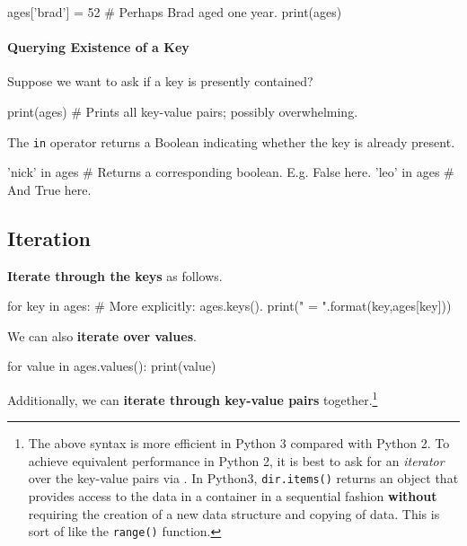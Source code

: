 \documentclass[12pt,letterpaper,twoside]{article}
\begin{document}
\begin{python}
ages['brad'] = 52   # Perhaps Brad aged one year.
print(ages)
\end{python}

\vspace{-12pt}
\paragraph{Querying Existence of a Key}

Suppose we want to ask if a key is presently contained?
\begin{python}
print(ages)  # Prints all key-value pairs; possibly overwhelming.
\end{python}

The \texttt{in} operator returns a Boolean indicating whether the key is already present.

\begin{python}
'nick' in ages  # Returns a corresponding boolean. E.g. False here.
'leo'  in ages  # And True here.
\end{python}

\vspace{-12pt}
\subsection{Iteration}
\textbf{Iterate through the keys} as follows.

\begin{python}
for key in ages:                            # More explicitly: ages.keys().
    print("{} = {}".format(key,ages[key]))
\end{python}

We can also \textbf{iterate over values}.

\begin{python}
for value in ages.values():
    print(value)
\end{python}

Additionally, we can \textbf{iterate through key-value pairs} together.\footnote{
The above syntax is more efficient in Python 3 compared
with Python 2. To achieve equivalent performance in Python 2, it is best
to ask for an \emph{iterator} over the key-value pairs via .
In Python3, \texttt{dir.items()} returns an object that provides access to the data in a container
in a sequential fashion \textbf{without} requiring the creation of a new
data structure and copying of data. This is sort of like the
\texttt{range()} function.}
\end{document}
